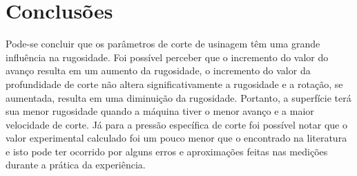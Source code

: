 \documentclass[deposito, acronym, symbols]{fei}
\begin{document}
 
 
\chapter{Conclusões}
Pode-se concluir que os parâmetros de corte de usinagem têm uma grande influência na rugosidade. Foi possível perceber que o incremento do valor do avanço resulta em um aumento da rugosidade, o incremento do valor da profundidade de corte não altera significativamente a rugosidade e a rotação, se aumentada, resulta em uma diminuição da rugosidade. Portanto, a superfície terá sua menor rugosidade quando a máquina tiver o menor avanço e a maior velocidade de corte.
Já para a pressão específica de corte foi possível notar que o valor experimental calculado foi um pouco menor que o encontrado na literatura e isto pode ter ocorrido por alguns erros e aproximações feitas nas medições durante a prática da experiência.

\printbibliography
\end{document}
